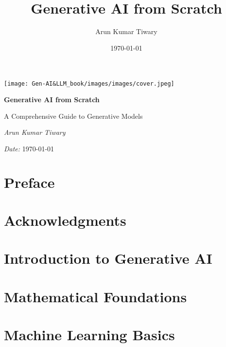 \documentclass[12pt]{book}
\title{\Huge \textbf{Generative AI from Scratch}}
\author{\Large Arun Kumar Tiwary}
\date{\today}
\begin{document}
\frontmatter

\begin{titlepage}
    \centering
    \vspace*{1cm}
    
    \texttt{[image: Gen-AI\&LLM\_book/images/images/cover.jpeg]}\par\vspace{1cm}
    
    {\Huge\bfseries Generative AI from Scratch \par}
    \vspace{0.5cm}
    {\LARGE A Comprehensive Guide to Generative Models \par}
    \vspace{1.5cm}
    {\Large\itshape Arun Kumar Tiwary \par}
    \vfill
    \vspace{0.8cm}
    {\Large \textit{Date:} \today \par}
    
    \vspace*{1cm}
\end{titlepage}

\tableofcontents

\chapter{Preface}


\chapter{Acknowledgments}


\mainmatter

\chapter{Introduction to Generative AI}


\chapter{Mathematical Foundations}


\chapter{Machine Learning Basics}

\end{document}
